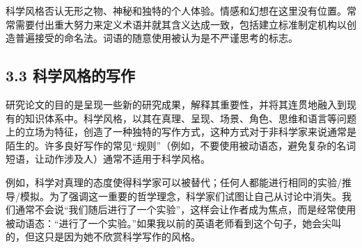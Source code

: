 科学风格否认无形之物、神秘和独特的个人体验。情感和幻想在这里没有位置。常常需要付出重大努力来定义术语并就其含义达成一致，包括建立标准制定机构以创造普遍接受的命名法。词语的随意使用被认为是不严谨思考的标志。

\subsection*{3.3 科学风格的写作}
研究论文的目的是呈现一些新的研究成果，解释其重要性，并将其连贯地融入到现有的知识体系中。科学风格，以其在真理、呈现、场景、角色、思维和语言等问题上的立场为特征，创造了一种独特的写作方式，这种方式对于非科学家来说通常是陌生的。许多良好写作的常见“规则”（例如，不要使用被动语态，避免复杂的名词短语，让动作涉及人）通常不适用于科学风格。

例如，科学对真理的态度使得科学家可以被替代；任何人都能进行相同的实验/推导/模拟。为了强调这一重要的哲学理念，科学家们试图让自己从讨论中消失。我们通常不会说“我们随后进行了一个实验”，这样会让作者成为焦点，而是经常使用被动语态：“进行了一个实验。”如果我以前的英语老师看到这个句子，她会尖叫的，但这只是因为她不欣赏科学写作的风格。

